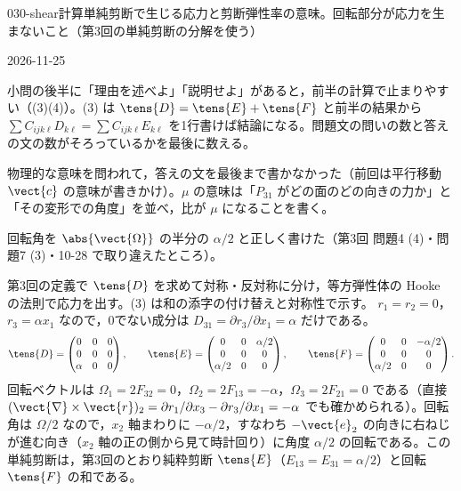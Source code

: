 \documentclass[uplatex,dvipdfmx,a4paper,11pt]{jsarticle}
\begin{document}
\begin{mondai}{030-shear}{計算}{単純剪断で生じる応力と剪断弾性率の意味。回転部分が応力を生まないこと（第3回の単純剪断の分解を使う）}
\begin{kotaeutsushi}{2026-11-25}
\end{kotaeutsushi}
\begin{kizuki}
\item 小問の後半に「理由を述べよ」「説明せよ」があると，前半の計算で止まりやすい（(3)(4)）。(3) は $\tens{D}=\tens{E}+\tens{F}$ と前半の結果から $\sum C_{ijk\ell}D_{k\ell}=\sum C_{ijk\ell}E_{k\ell}$ を1行書けば結論になる。問題文の問いの数と答えの文の数がそろっているかを最後に数える。
\item {} 物理的な意味を問われて，答えの文を最後まで書かなかった（前回は平行移動 $\vect{c}$ の意味が書きかけ）。$\mu$ の意味は「$P_{31}$ がどの面のどの向きの力か」と「その変形での角度」を並べ，比が $\mu$ になることを書く。
\item 回転角を $\abs{\vect{\Omega}}$ の半分の $\alpha/2$ と正しく書けた（第3回 問題4 (4)・問題7 (3)・10-28 で取り違えたところ）。
\end{kizuki}
\begin{tadashii}
\houshin 第3回の定義で $\tens{D}$ を求めて対称・反対称に分け，等方弾性体の Hooke の法則で応力を出す。(3) は和の添字の付け替えと対称性で示す。
\keisan {} $r_1=r_2=0$，$r_3=\alpha x_1$ なので，0でない成分は $D_{31}=\partial r_3/\partial x_1=\alpha$ だけである。
\[ \tens{D}=\begin{pmatrix}0&0&0\\0&0&0\\\alpha&0&0\end{pmatrix},\qquad \tens{E}=\begin{pmatrix}0&0&\alpha/2\\0&0&0\\\alpha/2&0&0\end{pmatrix},\qquad \tens{F}=\begin{pmatrix}0&0&-\alpha/2\\0&0&0\\\alpha/2&0&0\end{pmatrix}. \]
回転ベクトルは $\Omega_1=2F_{32}=0$，$\Omega_2=2F_{13}=-\alpha$，$\Omega_3=2F_{21}=0$ である（直接 $(\vect{\nabla}\times\vect{r})_2=\partial r_1/\partial x_3-\partial r_3/\partial x_1=-\alpha$ でも確かめられる）。回転角は $\Omega/2$ なので，$x_2$ 軸まわりに $-\alpha/2$，すなわち $-\vect{e}_2$ の向きに右ねじが進む向き（$x_2$ 軸の正の側から見て時計回り）に角度 $\alpha/2$ の回転である。この単純剪断は，第3回のとおり純粋剪断 $\tens{E}$（$E_{13}=E_{31}=\alpha/2$）と回転 $\tens{F}$ の和である。


\end{tadashii}
\end{mondai}
\end{document}
